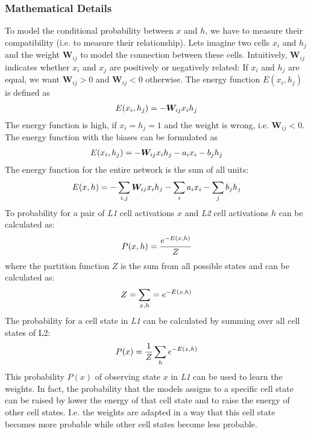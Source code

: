 \subsubsection{Mathematical Details}
To model the conditional probability between $x$ and $h$, we have to measure their compatibility (i.e. to measure their relationship).
Lets imagine two cells $x_i$ and $h_j$ and the weight $\boldsymbol{W}_{ij}$ to model the connection between these cells.
Intuitively, $\boldsymbol{W}_{ij}$ indicates whether $x_i$ and $x_j$ are positively or negatively related: If $x_i$ and $h_j$ are equal, we want $\boldsymbol{W}_{ij} > 0$ and $\boldsymbol{W}_{ij} < 0$ otherwise.
The energy function $E(x_i, h_j)$ is defined as
\begin{align}\eqlbl{l2_energy}
	E(x_i, h_j) = - \boldsymbol{W}_{ij}x_ih_j
\end{align}
The energy function is high, if $x_i=h_j=1$ and the weight is wrong, i.e. $\boldsymbol{W}_{ij} < 0$. The energy function with the biases can be formulated as
\begin{align}\eqlbl{l2_energy2}
	E(x_i, h_j) = - \boldsymbol{W}_{ij}x_ih_j - a_ix_i - b_jh_j
\end{align}
The energy function for the entire network is the sum of all units:
\begin{align}\eqlbl{l2_energy3}
	E(x, h) = - \sum_{i,j} \boldsymbol{W}_{ij}x_ih_j - \sum_ia_ix_i - \sum_jb_jh_j
\end{align}
To probability for a pair of \emph{L1} cell activations $x$ and \emph{L2} cell activations $h$ can be calculated as:
\begin{align}\eqlbl{l2_energy4}
	P(x,h) = \frac{e^{-E(x, h)}}{Z}
\end{align}
where the partition function $Z$ is the sum from all possible states and can be calculated as:
\begin{align}\eqlbl{l2_energy5}
	Z = \sum_{x,h} = e^{-E(x,h)}
\end{align}
The probability for a cell state in \emph{L1} can be calculated by summing over all cell states of L2:
\begin{align}\eqlbl{l2_energy6}
	P(x) = \frac{1}{Z} \sum_{h}e^{-E(x,h)}
\end{align}
This probability $P(x)$ of observing state $x$ in \emph{L1} can be used to learn the weights. In fact, the probability that the models assigns to a specific cell state can be raised by lower the energy of that cell state and to raise the energy of other cell states. I.e. the weights are adapted in a way that this cell state becomes more probable while other cell states become less probable.
